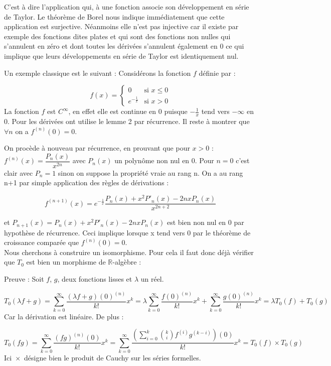 \documentclass[12pt,a4paper]{amsart}
\begin{document}
C'est à dire l'application qui, à une fonction associe son développement en série de Taylor. Le théorème de Borel nous indique immédiatement que cette application est surjective. Néanmoins elle n'est pas injective car il existe par exemple des fonctions dites plates et qui sont des fonctions non nulles qui s'annulent en zéro et dont toutes les dérivées s'annulent également en 0 ce qui implique que leurs développements en série de Taylor est identiquement nul.

Un exemple classique est le suivant : Considérons la fonction $f$ définie par : 

$$
f(x) = \left\{
    \begin{array}{ll}
       0 & \mbox{si } x\leq 0\\
        e^{-\frac{1}{x}} & \mbox{si } x>0
    \end{array}
\right.
$$
La fonction $f$ est $C^{\infty}$, en effet elle est continue en 0 puisque $-\frac{1}{x}$ tend vers $-\infty$ en 0. Pour les dérivées ont utilise le lemme 2 par récurrence. Il reste à montrer que $\forall n$ on a $f^{(n)}(0)=0$. 

On procède à nouveau par récurrence, en prouvant que pour $x>0$ : $f^{(n)}(x)= \dfrac{P_{n}(x)}{x^{2n}}$ avec $P_{n}(x)$ un polynôme non nul en 0. Pour $n=0$ c'est clair avec $P_{n}=1$ sinon on suppose la propriété vraie au rang n. On a au rang n+1 par simple application des règles de dérivations : 

$$f^{(n+1)}(x)=e^{-\frac{1}{x}}\dfrac{P_{n}(x)+x^{2}P'_{n}(x)-2nxP_{n}(x)}{x^{2n+2}}$$

et $P_{n+1}(x)= P_{n}(x)+x^{2}P'_{n}(x)-2nxP_{n}(x)$ est bien non nul en 0 par hypothèse de récurrence. Ceci implique lorsque x tend vers 0 par le théorème de croissance comparée que $f^{(n)}(0)=0$. \\

Nous cherchons à construire un isomorphisme. Pour cela il faut donc déjà vérifier que $T_{0}$ est bien un morphisme de $\mathbb{R}$-algèbre : 

Preuve : Soit $f$, $g$, deux fonctions lisses et $\lambda$ un réel. 

$$T_{0}(\lambda f + g)= \sum_{k=0}^{\infty} \dfrac{(\lambda f+g)(0)^{(n)}}{k!} x^{k} =\lambda \sum_{k=0}^{\infty} \dfrac{ f(0)^{(n)}}{k!}x^{k} + \sum_{k=0}^{\infty} \dfrac{g(0)^{(n)}}{k!}x^{k}= \lambda T_{0}(f)+ T_{0}(g)$$
Car la dérivation est linéaire. De plus : 

$$ T_{0}(fg)= \sum_{k=0}^{\infty} \dfrac{(fg)^{(n)}(0)}{k!}x^{k}= \sum_{k=0}^{\infty} \dfrac{(\sum_{i=0}^{k} \binom{k}{i}f^{(i)}g^{(k-i)})(0)}{k!}x^{k}= T_{0}(f)\times T_{0}(g)$$
Ici ${}\times $ désigne bien le produit de Cauchy sur les séries formelles. 
\end{document}
